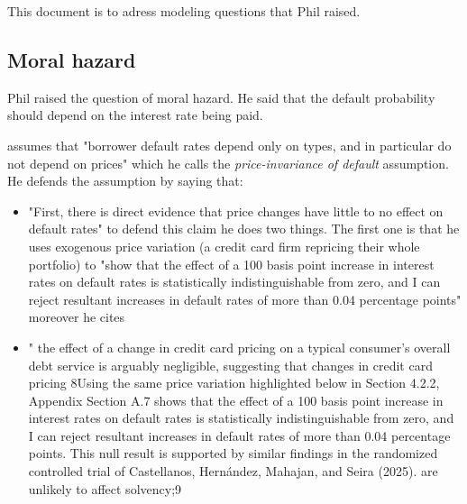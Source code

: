 \documentclass[12pt]{article}
\theoremstyle{plain}
\theoremstyle{plain}
\theoremstyle{definition}  %
\theoremstyle{remark}  %
\begin{document}
This document is to adress modeling questions that Phil raised. 

\subsection*{Moral hazard}
Phil raised the question of moral hazard. He said that the default probability should depend on the interest rate being paid. 

\textbf{\textcite{nelson_private_2025}}

\textcite[1383]{nelson_private_2025} assumes that "borrower default rates depend only on types, and in particular do not depend on prices" which he calls the \textit{price-invariance of default} assumption. He defends the assumption by saying that: 
\begin{itemize}
    \item "First, there is direct evidence that price changes have little to no effect on default rates" to defend this claim he does two things. The first one is that he uses exogenous price variation (a credit card firm repricing their whole portfolio) to "show that the effect of a 100 basis point increase in interest rates on default rates is statistically indistinguishable from zero, and I can reject resultant increases in default rates of more than 0.04 percentage points" moreover he cites \textcite{}
    


    \item " the effect of a change in credit card pricing on a typical consumer’s overall debt service is arguably negligible, suggesting that changes in credit card pricing  8Using the same price variation highlighted below in Section 4.2.2, Appendix Section A.7 shows that the effect of a 100 basis point increase in interest rates on default rates is statistically indistinguishable from zero, and I can reject resultant increases in default rates of more than 0.04 percentage points. This null result is supported by similar findings in the randomized controlled trial of Castellanos, Hernández, Mahajan, and Seira (2025). are unlikely to affect solvency;9
\end{itemize}









\newpage
\end{document}
